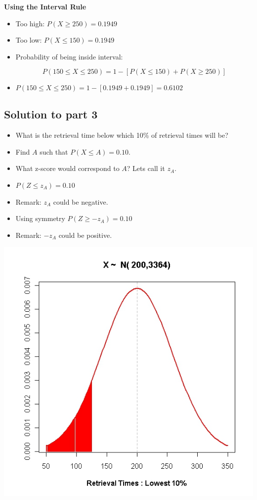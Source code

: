 ﻿\documentclass[]{report}
\begin{document}
	
	\textbf{Using the Interval Rule}
	\begin{itemize}
		\item Too high: $P( X \geq 250) = 0.1949 $
		\item Too low:  $P( X \leq 150) = 0.1949 $
		\item Probability of being inside interval:
		
		\[ P(150 \leq X \leq 250) = 1- [ P( X \leq 150) + P( X \geq 250)] \]
		
		\item $P(150 \leq X \leq 250) = 1- [ 0.1949 + 0.1949 ] = \boldsymbol{0.6102}$
		
	\end{itemize}	
	
\subsection{Solution to part 3}
	\begin{itemize}
		\item What is the retrieval time below which 10\% of retrieval times will be?
		\item Find $A$ such that $P(X \leq A) = 0.10$.
		\item What z-score would correspond to $A$? Lets call it $z_A$.
		\item $P(Z  \leq z_A) = 0.10$
		\item Remark: $z_A$ could be negative.
		\item Using symmetry $P(Z \geq -z_A) = 0.10$
		\item Remark: $-z_A$ could be positive.
	\end{itemize}


	
\begin{center}
\includegraphics[scale=0.40]{images/5BNormal4}
\end{center}
	
\end{document}
